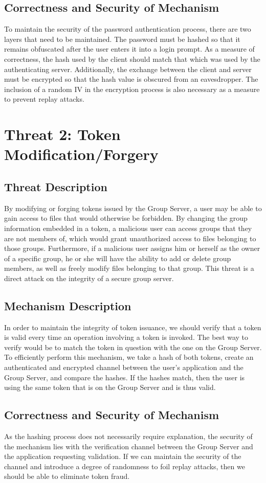 \documentclass[11pt]{article}
\begin{document}
\subsection{Correctness and Security of Mechanism}
To maintain the security of the password authentication process, there are two layers that need to be maintained. The password must be hashed so that it remains obfuscated after the user enters it into a login prompt. As a measure of correctness, the hash used by the client should match that which was used by the authenticating server. Additionally, the exchange between the client and server must be encrypted so that the hash value is obscured from an eavesdropper. The inclusion of a random IV in the encryption process is also necessary as a measure to prevent replay attacks.
\section{Threat 2: Token Modification/Forgery}
\subsection{Threat Description}
By modifying or forging tokens issued by the Group Server, a user may be able to gain access to files that would otherwise be forbidden. By changing the group information embedded in a token, a malicious user can access groups that they are not members of, which would grant unauthorized access to files belonging to those groups. Furthermore, if a malicious user assigns him or herself as the owner of a specific group, he or she will have the ability to add or delete group members, as well as freely modify files belonging to that group. This threat is a direct attack on the integrity of a secure group server.
\subsection{Mechanism Description}
In order to maintain the integrity of token issuance, we should verify that a token is valid every time an operation involving a token is invoked. The best way to verify would be to match the token in question with the one on the Group Server. To efficiently perform this mechanism, we take a hash of both tokens, create an authenticated and encrypted channel between the user's application and the Group Server, and compare the hashes. If the hashes match, then the user is using the same token that is on the Group Server and is thus valid.
\subsection{Correctness and Security of Mechanism}
As the hashing process does not necessarily require explanation, the security of the mechanism lies with the verification channel between the Group Server and the application requesting validation. If we can maintain the security of the channel and introduce a degree of randomness to foil replay attacks, then we should be able to eliminate token fraud.
\end{document}
